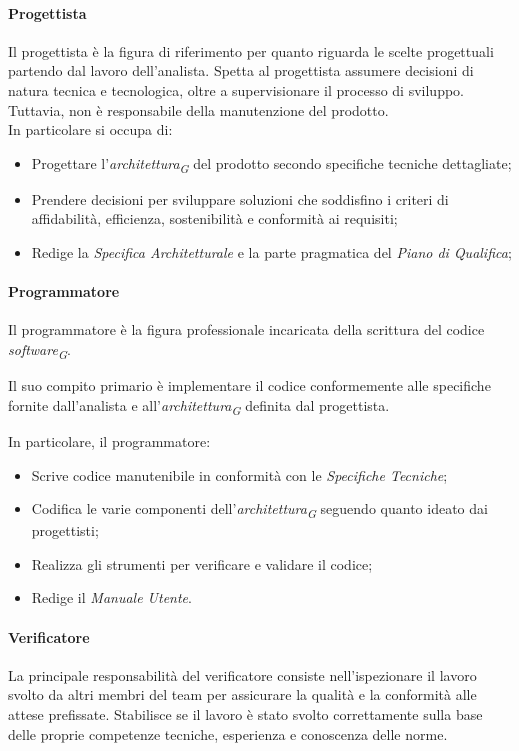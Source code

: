 \paragraph{Progettista}\label{progettista}
Il progettista è la figura di riferimento per quanto riguarda le scelte progettuali partendo dal lavoro dell'analista. Spetta al progettista assumere decisioni di natura tecnica e tecnologica, oltre a supervisionare il processo di sviluppo. Tuttavia, non è responsabile della manutenzione del prodotto. \\
In particolare si occupa di:
\begin{itemize}
		\item Progettare l'\textit{architettura}\textsubscript{\textit{G}} del prodotto secondo specifiche tecniche dettagliate;
		\item Prendere decisioni per sviluppare soluzioni che soddisfino i criteri di affidabilità, efficienza, sostenibilità e conformità ai requisiti;
		\item Redige la \textit{Specifica Architetturale} e la parte pragmatica del \textit{Piano di Qualifica};
\end{itemize}

\paragraph{Programmatore}
\label{par:programmatore}
Il programmatore è la figura professionale incaricata della scrittura del codice \textit{software}\textsubscript{\textit{G}}.

Il suo compito primario è implementare il codice conformemente alle specifiche fornite dall'analista e all'\textit{architettura}\textsubscript{\textit{G}} definita dal progettista.

In particolare, il programmatore:
\begin{itemize}
	\item Scrive codice manutenibile in conformità con le \textit{Specifiche Tecniche};
	\item Codifica le varie componenti dell'\textit{architettura}\textsubscript{\textit{G}} seguendo quanto ideato dai progettisti;
	\item Realizza gli strumenti per verificare e validare il codice;
	\item Redige il \textit{Manuale Utente}.
\end{itemize}

\paragraph{Verificatore}\label{verificatore} La principale responsabilità del verificatore consiste nell'ispezionare il lavoro svolto da altri membri del team per assicurare la qualità e la conformità alle attese prefissate.
Stabilisce se il lavoro è stato svolto correttamente sulla base delle proprie competenze tecniche, esperienza e conoscenza delle norme.

